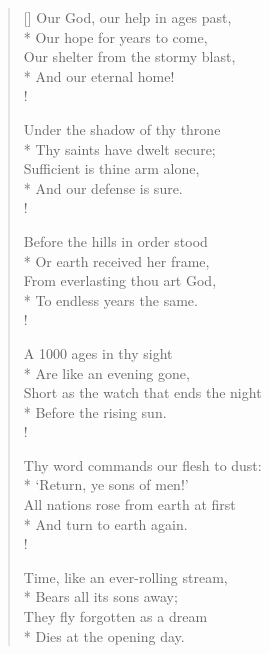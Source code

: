 \documentclass[MAIN]{subfiles}
\begin{document}
\settowidth{\versewidth}{Our God, our help in ages past,}
\begin{verse}[\versewidth]
Our God, our help in ages past,\\* 
\vin Our hope for years to come,\\
Our shelter from the stormy blast,\\*
\vin And our eternal home!\\!

Under the shadow of thy throne\\*
\vin Thy saints have dwelt secure;\\
Sufficient is thine arm alone,\\*
\vin And our defense is sure.\\!

Before the hills in order stood\\*
\vin Or earth received her frame,\\
From everlasting thou art God,\\*
\vin To endless years the same.\\!

A 1000 ages in thy sight\\*
\vin Are like an evening gone,\\
Short as the watch that ends the night\\*
\vin Before the rising sun.\\!

Thy word commands our flesh to dust:\\*
\vin `Return, ye sons of men!'\\
All nations rose from earth at first\\*
\vin And turn to earth again.\\!

Time, like an ever-rolling stream,\\*
\vin Bears all its sons away;\\
They fly forgotten as a dream\\*
\vin Dies at the opening day.
\end{verse}
\end{document}
